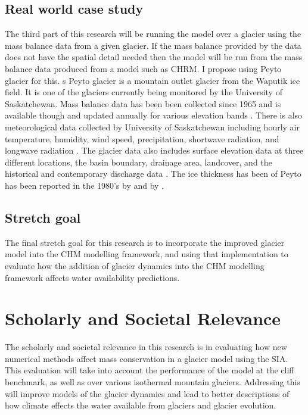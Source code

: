 \documentclass{article}
\begin{document}
\subsection{Real world case study}
The third part of this research will be running the model over a glacier using the mass balance data from a given glacier. If the mass balance provided by the data does not have the spatial detail needed then the model will be run from the mass balance data produced from a model such as CHRM. I propose using Peyto glacier for this. s Peyto glacier is a mountain outlet glacier from the Waputik ice field. It is one of the glaciers currently being monitored by the University of Saskatchewan. Mass balance data has been been collected since 1965 and is available though \citet{WGMS2020} and updated annually for various elevation bands \citep{Pradhananga2020}. There is also meteorological data collected by University of Saskatchewan including hourly air temperature, humidity, wind speed, precipitation, shortwave radiation, and longwave radiation \citep{Pradhananga2020}. The glacier data also includes surface elevation data at three different locations, the basin boundary, drainage area, landcover, and the historical and contemporary discharge data \citep{Pradhananga2020}. The ice thickness has been of Peyto has been reported in the 1980's by \citet{Holdsworth2006} and by \citet{kehrl2014}. 


\subsection{Stretch goal}
The final stretch goal for this research is to incorporate the improved glacier model into the CHM modelling framework, and using that implementation to evaluate how the addition of glacier dynamics into the CHM modelling framework affects water availability predictions. 


\section{Scholarly and Societal Relevance}
The scholarly and societal relevance in this research is in evaluating how new numerical methods affect mass conservation in a glacier model using the SIA. This evaluation will take into account the performance of the model at the cliff benchmark, as well as over various isothermal mountain glaciers. Addressing this will improve models of the glacier dynamics and lead to better descriptions of how climate effects the water available from glaciers and glacier evolution. 
\end{document}
